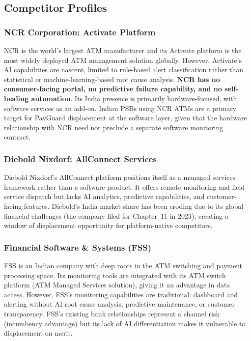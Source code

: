 \documentclass[12pt,a4paper]{article}
\begin{document}
\subsection{Competitor Profiles}

\subsubsection{NCR Corporation: Activate Platform}

NCR is the world's largest ATM manufacturer and its Activate platform is the most widely deployed
ATM management solution globally. However, Activate's AI capabilities are nascent, limited to
rule-based alert classification rather than statistical or machine-learning-based root cause
analysis. \textbf{NCR has no consumer-facing portal, no predictive failure capability, and no
self-healing automation}. Its India presence is primarily hardware-focused, with software services
as an add-on. Indian PSBs using NCR ATMs are a primary target for PayGuard displacement at the
software layer, given that the hardware relationship with NCR need not preclude a separate
software monitoring contract.

\subsubsection{Diebold Nixdorf: AllConnect Services}

Diebold Nixdorf's AllConnect platform positions itself as a managed services framework rather
than a software product. It offers remote monitoring and field service dispatch but lacks AI
analytics, predictive capabilities, and customer-facing features. Diebold's India market share
has been eroding due to its global financial challenges (the company filed for Chapter~11 in
2023), creating a window of displacement opportunity for platform-native competitors.

\subsubsection{Financial Software \& Systems (FSS)}

FSS is an Indian company with deep roots in the ATM switching and payment processing space.
Its monitoring tools are integrated with its ATM switch platform (ATM Managed Services solution),
giving it an advantage in data access. However, FSS's monitoring capabilities are traditional:
dashboard and alerting without AI root cause analysis, predictive maintenance, or customer
transparency. FSS's existing bank relationships represent a channel risk (incumbency advantage)
but its lack of AI differentiation makes it vulnerable to displacement on merit.
\end{document}
